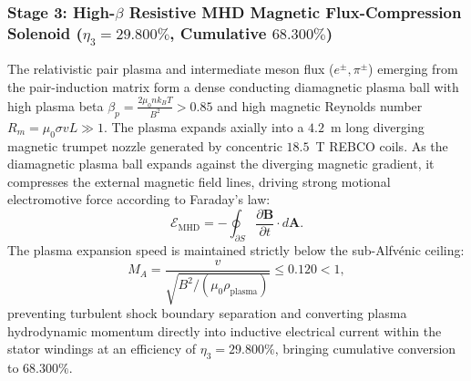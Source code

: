 \documentclass[11pt,onecolumn]{article}
\begin{document}
\FloatBarrier
\subsubsection{Stage 3: \texorpdfstring{High-$\beta$}{High-Beta} Resistive MHD Magnetic Flux-Compression Solenoid (\texorpdfstring{$\eta_3 = 29.800\%$}{eta3 = 29.800\%}, Cumulative \texorpdfstring{$68.300\%$}{68.300\%})}
\label{subsubsec:mhd_solenoid}
The relativistic pair plasma and intermediate meson flux ($e^\pm, \pi^\pm$) emerging from the pair-induction matrix form a dense conducting diamagnetic plasma ball with high plasma beta $\beta_p = \frac{2\mu_0 n k_B T}{B^2} > 0.85$ and high magnetic Reynolds number $R_m = \mu_0 \sigma v L \gg 1$. The plasma expands axially into a $4.2$~m long diverging magnetic trumpet nozzle generated by concentric $18.5$~T REBCO coils. As the diamagnetic plasma ball expands against the diverging magnetic gradient, it compresses the external magnetic field lines, driving strong motional electromotive force according to Faraday's law:
\begin{equation}
\mathcal{E}_{\text{MHD}} = -\oint_{\partial S} \frac{\partial \mathbf{B}}{\partial t}\cdot d\mathbf{A}.
\end{equation}
The plasma expansion speed is maintained strictly below the sub-Alfvénic ceiling:
\begin{equation}
M_A = \frac{v}{\sqrt{B^2 / (\mu_0 \rho_{\text{plasma}})}} \le 0.120 < 1,
\end{equation}
preventing turbulent shock boundary separation and converting plasma hydrodynamic momentum directly into inductive electrical current within the stator windings at an efficiency of $\eta_3 = 29.800\%$, bringing cumulative conversion to $68.300\%$.

\FloatBarrier
\end{document}
